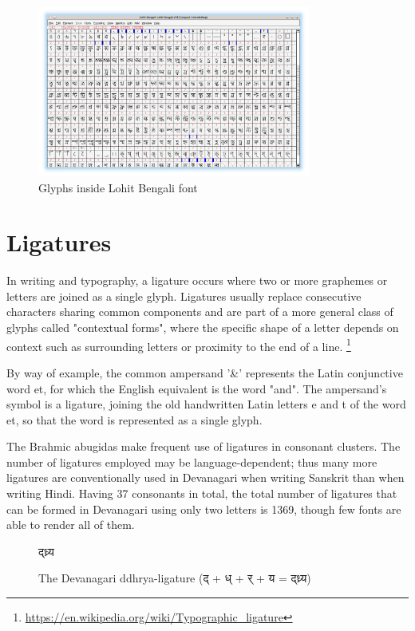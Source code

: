 \begin{figure}[h]
    \centering
    \includegraphics[width=0.8\textwidth]{glyph-fontforge-lohit-bengali.png}
    \caption{Glyphs inside Lohit Bengali font}
\end{figure}

\section{Ligatures }

In writing and typography, a ligature occurs where two or more graphemes or
letters are joined as a single glyph. Ligatures usually replace consecutive
characters sharing common components and are part of a more general class of
glyphs called "contextual forms", where the specific shape of a letter depends
on context such as surrounding letters or proximity to the end of a line.
\footnote{\url{https://en.wikipedia.org/wiki/Typographic_ligature}}

By way of example, the common ampersand '\&' represents the Latin conjunctive
word et, for which the English equivalent is the word "and". The ampersand's
symbol is a ligature, joining the old handwritten Latin letters e and t of the
word et, so that the word is represented as a single glyph.

The Brahmic abugidas make frequent use of ligatures in consonant clusters. The
number of ligatures employed may be language-dependent; thus many more ligatures
are conventionally used in Devanagari when writing Sanskrit than when writing
Hindi. Having 37 consonants in total, the total number of ligatures that can be
formed in Devanagari using only two letters is 1369, though few fonts are able
to render all of them.

\begin{figure}[h]
   \centering
   {\hindi\textexample द्ध्र्य }
   \caption{The Devanagari ddhrya-ligature {\hindi (द् + ध् + र् + य = द्ध्र्य)
} }
\end{figure}

